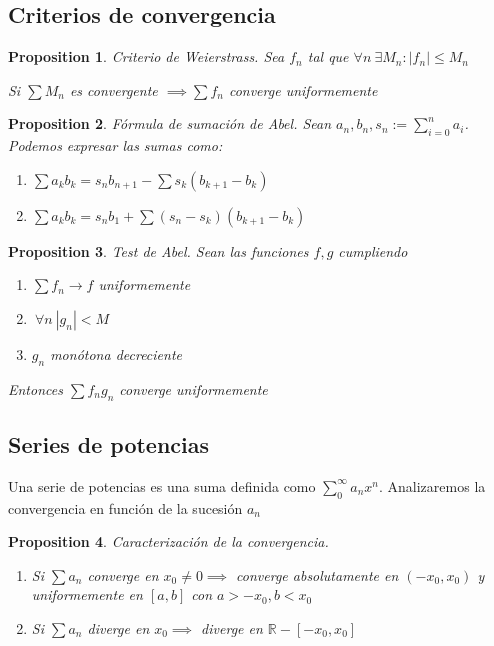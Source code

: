 \documentclass[leqno]{article}
\newtheorem*{proposition}{Proposition}
\begin{document}
\subsection{Criterios de convergencia}
\begin{proposition}
 Criterio de Weierstrass. Sea $f_n$ tal que  $\forall n \ \exists M_n : |f_n|\le M_n$

 Si $\sum M_n$ es convergente  $\implies \sum f_n$ converge uniformemente
\end{proposition}

\begin{proposition}
Fórmula de sumación de Abel. Sean $a_n, b_n, s_n := \sum_{i=0}^n a_i$. Podemos expresar las sumas como:
\begin{enumerate}[topsep=0pt, itemsep=0pt]
  \item $\displaystyle\sum a_kb_k = s_nb_{n+1} - \sum s_k(b_{k+1}-b_k)$ 
  \item $\displaystyle\sum a_kb_k = s_nb_1 + \sum (s_n-s_k)(b_{k+1}-b_k)$ 
\end{enumerate}
\end{proposition}

\begin{proposition}
Test de Abel. Sean las funciones $f, g$ cumpliendo
 \begin{enumerate}[topsep=0pt, itemsep=0pt]
  \item $\sum f_n\to f$ uniformemente
  \item  $\ \forall n \ |g_n| <M$
  \item $g_n$ monótona decreciente
\end{enumerate}
Entonces $\sum f_ng_n$ converge uniformemente
\end{proposition}

\subsection{Series de potencias}
Una serie de potencias es una suma definida como $\displaystyle \sum_0^\infty a_nx^n$. Analizaremos la convergencia en función de la sucesión $a_n$
\begin{proposition}
Caracterización de la convergencia.
\begin{enumerate}[topsep=0pt, itemsep=0pt]
  \item Si $\sum a_n$ converge en $x_0\neq 0 \implies $ converge absolutamente en $(-x_0, x_0)$ y uniformemente en $[a, b]$ con  $a>-x_0, b<x_0$
  \item Si  $\sum a_n$ diverge en $x_0 \implies$ diverge en $\mathbb{R}-[-x_0, x_0]$
\end{enumerate}
\end{proposition}
\end{document}
